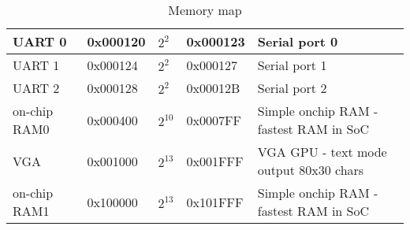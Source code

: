 \begin{table}[h]
\begin{tabular}{|l|l|l|l|l|}
        UART 0              & 0x000120      & $2^{2}$       & 0x000123     & Serial port 0                                  \\ \hline
        UART 1              & 0x000124      & $2^{2}$       & 0x000127     & Serial port 1                                  \\ \hline
        UART 2              & 0x000128      & $2^{2}$       & 0x00012B     & Serial port 2                                  \\ \hline
        on-chip RAM0        & 0x000400      & $2^{10}$      & 0x0007FF     & Simple onchip RAM - fastest RAM in SoC         \\ \hline
        VGA                 & 0x001000      & $2^{13}$      & 0x001FFF     & VGA GPU - text mode output 80x30 chars         \\ \hline
        on-chip RAM1        & 0x100000      & $2^{13}$      & 0x101FFF     & Simple onchip RAM - fastest RAM in SoC         \\ \hline
    \end{tabular}
    \caption{Memory map}
    \label{tab:memory_map}
\end{table}
